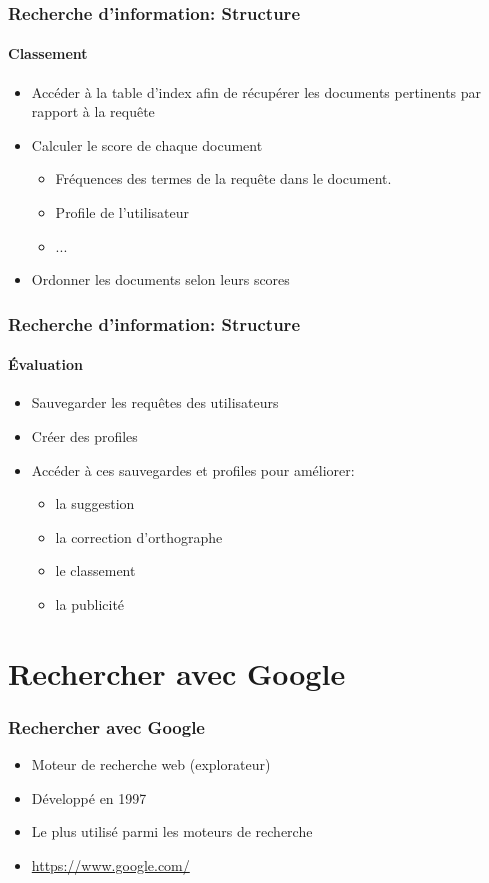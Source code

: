 \documentclass{beamer}
\begin{document}
\begin{frame}
\frametitle{Recherche d'information: Structure}
\framesubtitle{Classement}

\begin{itemize}
	\item Accéder à la table d'index afin de récupérer les documents pertinents par rapport à la requête
	\item Calculer le score de chaque document
	\begin{itemize}
		\item Fréquences des termes de la requête dans le document. 
		\item Profile de l'utilisateur 
		\item ...
	\end{itemize}
	\item Ordonner les documents selon leurs scores
\end{itemize}

\end{frame}

\begin{frame}
\frametitle{Recherche d'information: Structure}
\framesubtitle{Évaluation}

\begin{itemize}
	\item Sauvegarder les requêtes des utilisateurs 
	\item Créer des profiles 
	\item Accéder à ces sauvegardes et profiles pour améliorer:
	\begin{itemize}
		\item la suggestion  
		\item la correction d'orthographe 
		\item le classement
		\item la publicité 
	\end{itemize}
\end{itemize}

\end{frame}

\section{Rechercher avec Google}

\begin{frame}
\frametitle{Rechercher avec Google}

\begin{itemize}
	\item Moteur de recherche web (explorateur)
	\item Développé en 1997
	\item Le plus utilisé parmi les moteurs de recherche
	\item \url{https://www.google.com/}
\end{itemize}

\end{frame}
\end{document}
